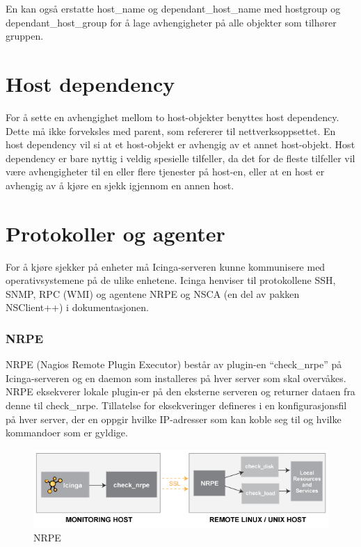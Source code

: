 En kan også erstatte host\_name og dependant\_host\_name med hostgroup og dependant\_host\_group for å lage avhengigheter på alle objekter som tilhører gruppen.

\section{Host dependency}
For å sette en avhengighet mellom to host-objekter benyttes host dependency. Dette må ikke forveksles med parent, som refererer til nettverksoppsettet. En host dependency vil si at et host-objekt er avhengig av et annet host-objekt. Host dependency er bare nyttig i veldig spesielle tilfeller, da det for de fleste tilfeller vil være avhengigheter til en eller flere tjenester på host-en\cite{hostandservicedep}, eller at en host er avhengig av å kjøre en sjekk igjennom en annen host.

\clearpage
\section{Protokoller og agenter}
For å kjøre sjekker på enheter må Icinga-serveren kunne kommunisere med operativsystemene på de ulike enhetene. Icinga henviser til protokollene SSH, SNMP, RPC (WMI) og agentene NRPE og NSCA (en del av pakken NSClient++) i dokumentasjonen\cite{icingaintegration,icingaadditionalsoftware}. 

\subsubsection{NRPE}\label{sec:nrpe}
NRPE (Nagios Remote Plugin Executor) består av plugin-en ``check\_nrpe'' på Icinga-serveren og en daemon som installeres på hver server som skal overvåkes. NRPE eksekverer lokale plugin-er på den eksterne serveren og returner dataen fra denne til check\_nrpe. Tillatelse for eksekveringer defineres i en konfigurasjonsfil på hver server, der en oppgir hvilke IP-adresser som kan koble seg til og hvilke kommandoer som er gyldige. 

\begin{figure}[H]
    \centering
    \includegraphics[scale=0.6]{img/nrpe.png}
    \caption{NRPE}
    \label{nrpe}
\end{figure}

